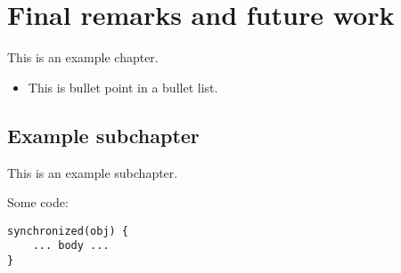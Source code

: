 \chapter{Final remarks and future work}
This is an example chapter.
\begin{itemize}
    \item This is bullet point in a bullet list.
\end{itemize}

\section{Example subchapter}
This is an example subchapter.

Some code:
\begin{lstlisting}
synchronized(obj) {
    ... body ...
}
\end{lstlisting}